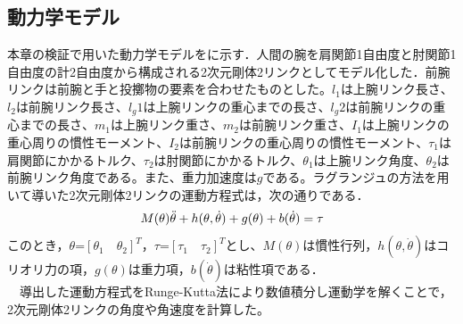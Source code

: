 \begin{small}
\subsection{動力学モデル}
本章の検証で用いた動力学モデルをに示す．人間の腕を肩関節1自由度と肘関節1自由度の計2自由度から構成される2次元剛体2リンクとしてモデル化した．前腕リンクは前腕と手と投擲物の要素を合わせたものとした。$l_{1}$は上腕リンク長さ、$l_{2}$は前腕リンク長さ、$l_g{1}$は上腕リンクの重心までの長さ、$l_g{2}$は前腕リンクの重心までの長さ、$m_{1}$は上腕リンク重さ、$m_{2}$は前腕リンク重さ、$I_{1}$は上腕リンクの重心周りの慣性モーメント、$I_{2}$は前腕リンクの重心周りの慣性モーメント、$\tau_{1}$は肩関節にかかるトルク、$\tau_{2}$は肘関節にかかるトルク、$\theta_{1}$は上腕リンク角度、$\theta_{2}$は前腕リンク角度である。また、重力加速度は$g$である。ラグランジュの方法を用いて導いた2次元剛体2リンクの運動方程式は，次の通りである．
\begin{eqnarray}
  \equlabel{5}
  M(\theta)\ddot{\theta} + h(\theta, \dot{\theta}) + g(\theta) + b(\dot{\theta}) = \tau
\end{eqnarray}
このとき，$\theta$=${[\theta_{1} \quad \theta_{2}]}^T$，$\tau$=${[\tau_{1} \quad \tau_{2}]}^T$とし、$M(\theta)$は慣性行列，$h(\theta, \dot{\theta})$はコリオリ力の項，$g(\theta)$は重力項，$b(\dot{\theta})$は粘性項である．\\
　導出した運動方程式をRunge-Kutta法\cite{runge-kutta}により数値積分し運動学を解くことで，2次元剛体2リンクの角度や角速度を計算した。

\end{small}
